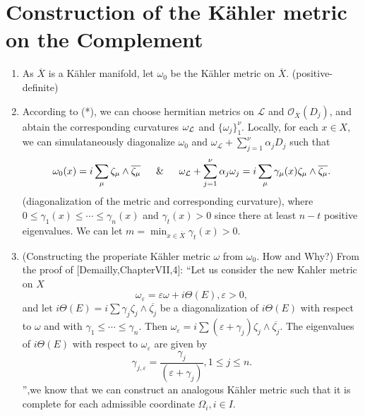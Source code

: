 \documentclass[lang=en,12pt]{beautybook}
\begin{document}
\section{Construction of the K\"ahler metric on the Complement}

\begin{enumerate}
  \item As $\overline{X}$ is a K\"ahler manifold, let $\omega_0$ be the K\"ahler
  metric on $\overline{X}$. (positive-definite)
  
  \item According to (*), we can choose hermitian metrics on $\mathcal{L}$ and
  $\mathcal{O}_{\overline{X}} (D_j)$, and abtain the corresponding curvatures
  ${{\omega_{\mathcal{L}}} }_{\texttt{\text{{\ttfamily{}}}}}$ and $\{ \omega_j
  \}_1^{\nu}$. Locally, for each $x \in X$, we can simulataneously diagonalize
  $\omega_0$ and $\omega_{\mathcal{L}} + \sum_{j = 1}^{\nu} \alpha_j D_j$ such
  that
  \[ \omega_0 (x) = i \sum_{\mu} \zeta_{\mu} \wedge \overline{\zeta_{\mu}} 
     \quad\And\quad \omega_{\mathcal{L}} + \sum_{j = 1}^{\nu} \alpha_j \omega_j = i
     \sum_{\mu} \gamma_{\mu} (x) \zeta_{\mu} \wedge \overline{\zeta_{\mu}} .
  \]
  (diagonalization of the metric and corresponding curvature), where $0 \leqslant \gamma_1 (x)
  \leqslant \cdots \leqslant \gamma_n (x)$ and $\gamma_t (x) > 0$ since there
  at least $n - t$ positive eigenvalues. We can let $m = \min_{x \in
  \overline{X}} \gamma_t (x) > 0$.
  
  \item\label{Demailly} (Constructing the properiate K\"ahler metric $\omega$ from $\omega_0$.
  How and Why?) {\color{purple}From the proof of [Demailly,ChapterVII,4]: ``Let us consider
  the new Kahler metric on $X$
  \[ \omega_{\varepsilon} = \varepsilon \omega + i \Theta (E), \varepsilon >
     0, \]
  and let $i \Theta (E) = i \sum \gamma_j \zeta_j \wedge \overline{\zeta_j}$
  be a diagonalization of $i \Theta (E)$ with respect to $\omega$ and with
  $\gamma_1 \leqslant \cdots \leqslant \gamma_n .$ Then $\omega_{\varepsilon}
  = i \sum (\varepsilon + \gamma_j) \zeta_j \wedge \overline{\zeta_j}$. The
  eigenvalues of $i \Theta (E)$ with respect to $\omega_{\varepsilon}$ are
  given by
  \[ \gamma_{j, \varepsilon} = \frac{\gamma_j}{(\varepsilon + \gamma_j)}, 1
     \leqslant j \leqslant n. \]
  ''},we know that we can construct an analogous K\"ahler metric such that it is
  complete for each admissible coordinate $\Omega_i, i \in I$.
  

\end{enumerate}
\end{document}
